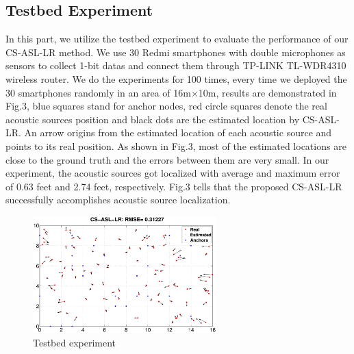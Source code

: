 \subsection{Testbed Experiment}
In this part, we utilize the testbed experiment to evaluate the performance of our CS-ASL-LR method. We use 30 Redmi smartphones with double microphones as sensors to collect 1-bit datas and connect them through TP-LINK TL-WDR4310 wireless router. We do the experiments for 100 times, every time we deployed the 30 smartphones randomly in an area of 16m$\times$10m, results are demonstrated in Fig.3, blue squares stand for anchor nodes, red circle squares denote the real acoustic sources position and black dots are the estimated location by CS-ASL-LR. An arrow origins from the estimated location of each acoustic source and points to its real position. As shown in Fig.3, most of the estimated locations are close to the ground truth and the errors between them are very small. In our experiment, the acoustic sources got localized with average and maximum error of 0.63 feet and 2.74 feet, respectively. Fig.3 tells that the proposed CS-ASL-LR successfully accomplishes acoustic source localization.

\begin{figure}[htb]
	\centering
	\includegraphics[height=4.5cm]{image/lab.eps} 
	\caption{Testbed experiment}
	\label{overview}
\end{figure} 
\vspace{-5mm}


